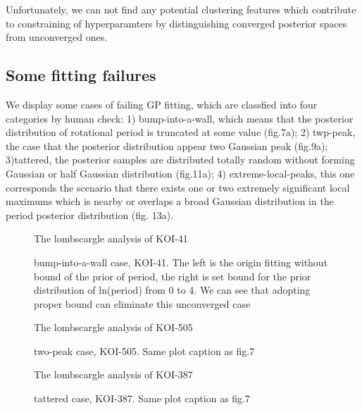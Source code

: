 \documentclass{aastex62}
\begin{document}
Unfortunately, we can not find any potential clustering features which contribute to constraining of hyperparamters by distinguishing converged posterior spaces from unconverged ones. 

\subsection{Some fitting failures}
We display some cases of failing GP fitting, which are classfied into four categories by human check: 1) bump-into-a-wall, which means that the posterior distribution of rotational period is truncated at some value (fig.7a); 2) twp-peak, the case that the posterior distribution appear two Gaussian peak (fig.9a); 3)tattered, the posterior samples are distributed totally random without forming Gaussian or half Gaussian distribution (fig.11a); 4) extreme-local-peaks, this one corresponds the scenario that there exists one or two extremely significant local maximums which is nearby or overlaps a broad Gaussian distribution in the period posterior distribution (fig. 13a).

\begin{figure}
\caption{The lombscargle analysis of KOI-41}
\end{figure}

\begin{figure}
\caption{bump-into-a-wall case, KOI-41. The left is the origin fitting without bound of the prior of period, the right is set bound for the prior distribution of ln(period) from 0 to 4. We can see that adopting proper bound can eliminate this unconverged case}
\end{figure}

\begin{figure}
\caption{The lombscargle analysis of KOI-505}
\end{figure}

\begin{figure}
\caption{two-peak case, KOI-505. Same plot caption as fig.7}
\end{figure}

\begin{figure}
\caption{The lombscargle analysis of KOI-387}
\end{figure}

\begin{figure}
\caption{tattered case, KOI-387. Same plot caption as fig.7}
\end{figure}
\end{document}
